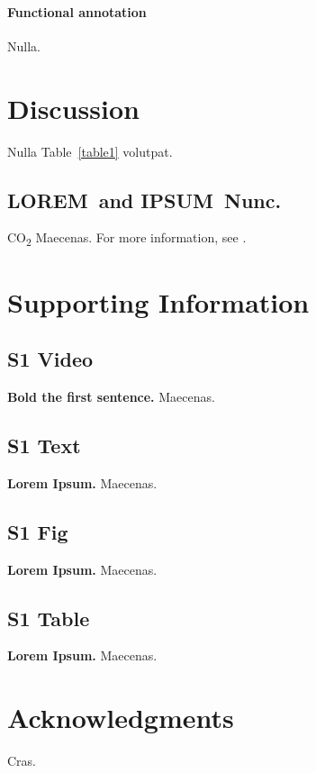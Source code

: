 \documentclass[10pt,letterpaper]{article}
\newcommand{\lorem}{{\bf LOREM}}
\newcommand{\ipsum}{{\bf IPSUM}}
\begin{document}
\paragraph{Functional annotation} Nulla.

\section*{Discussion}
Nulla Table~\ref{table1} volutpat. 

\subsection*{\lorem\ and \ipsum\ Nunc.}

CO\textsubscript{2} Maecenas. For more information, see .

\section*{Supporting Information}

\subsection*{S1 Video}
\label{S1_Video}
{\bf Bold the first sentence.}  Maecenas.

\subsection*{S1 Text}
\label{S1_Text}
{\bf Lorem Ipsum.} Maecenas.

\subsection*{S1 Fig}
\label{S1_Fig}
{\bf Lorem Ipsum.} Maecenas.

\subsection*{S1 Table}
\label{S1_Table}
{\bf Lorem Ipsum.} Maecenas.

\section*{Acknowledgments}
Cras.
\end{document}
